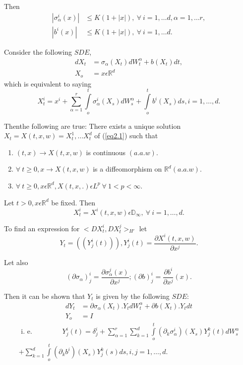 Then
\begin{align*}
  |\sigma^i_\alpha(x)| & \le K(1 + |x|), ~\forall~ i = 1, \ldots d, \alpha
  = 1, \ldots r,\\ 
  |b^i(x)| & \le K(1 + |x|), ~\forall~ i = 1, \ldots d.
\end{align*}

Consider the following $SDE$,
\begin{align*}
  dX_t & = \sigma_\alpha (X_t) dW ^\alpha_t + b(X_t) dt,\\
  X_o & = x \epsilon  \mathbb{R}^d \tag{2.1}\label{eq2.1}
\end{align*}
which is equivalent to saying
$$
X^i_t=x^i + \sum_{\alpha=1}^r \int\limits_o^t \sigma^i_\alpha
(X_s)dW^\alpha_s + \int\limits_o^t b^i (X_s) ds, i=1,\ldots, d. 
$$

Then\pageoriginale the following are true: There exists a unique
solution $X_t = X (t,x,w) = X_t^1,\ldots X_t^d$ of (\ref{eq2.1}) such that 
\begin{enumerate}[1)]
\item $ (t,x) \to X(t,x,w)$ is continuous $(a.a.w)$.

\item $\forall~ t \ge 0,x \to X(t,x,w)$ is a diffeomorphism on
  $\mathbb{R}^d (a.a.w)$. 

\item $\forall~ t \ge 0, x \epsilon  \mathbb{R}^d, X(t,x,.)
  \epsilon  L^p ~\forall~ 1 < p < \infty$. 
\end{enumerate}

\setcounter{theorem}{0}
\begin{theorem}\label{chap2:thm2.1}%
  Let $t > 0, x \epsilon  \mathbb{R}^d$ be fixed. Then
  $$
  X^i_t = X^i (t,x,w) \epsilon  \mathbb{D}_\infty,~\forall~ i =
  1,\ldots, d. 
  $$
\end{theorem}

To find an expression for $ < DX^i_t, DX^j_t >_{H'}$ let 
$$
Y_t = ((Y^i_j(t))), Y^i_j(t) = \frac{\partial X^i (t,x,w)} {\partial x^j}.
$$

Let also
$$
(\partial \sigma_\alpha)^i_j = \frac{\partial \sigma_\alpha^j (x)}
{\partial x^j}; (\partial b)^i_j =\frac{\partial b^i} {\partial
  x^j}(x). 
$$

Then it can be shown that $Y_t$ is given by the following $SDE$: 
\begin{align*}
  dY_t & = \partial \sigma_\alpha (X_t).Y_t dW^\alpha_t + \partial
  b(X_t). Y_t dt\\ 
  Y_o & = I \tag{2.2}\label{eq2.2}
\end{align*}
\begin{multline*}
 \text { i. e. } \qquad \qquad Y^i_j (t)  = \delta^i_j + \sum_{\alpha=1}^r
 \sum_{k=1}^d \int\limits_o^t (\partial_k \sigma^i_\alpha) (X_s) Y^k_j
 (t) dW^\alpha_s \\ 
  + \sum_{k=1}^d \int\limits_o^t (\partial_k b^i)(X_s)Y^k_j(s) ds, i,j
  = 1,\ldots, d. 
\end{multline*}


